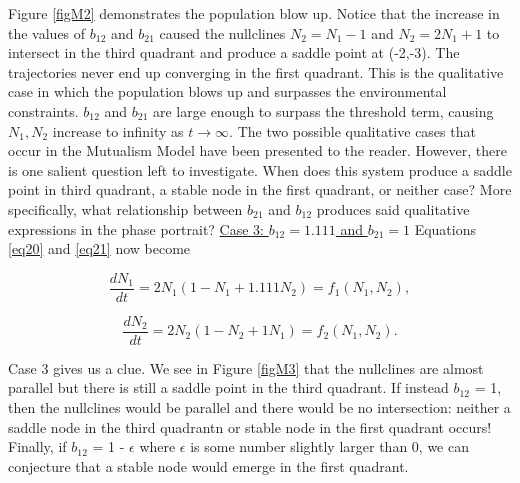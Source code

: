 \documentclass[11pt,a4paper]{scrartcl}
\theoremstyle{definition}
\begin{document}
Figure \ref{figM2} demonstrates the population blow up. Notice that the increase in the values of $b_{12}$ and $b_{21}$ caused the nullclines $N_2=N_1-1$ and $N_2=2N_1+1$ to intersect in the third quadrant and produce a saddle point at (-2,-3). The trajectories never end up converging in the first quadrant. This is the qualitative case in which the population blows up and surpasses the environmental constraints. $b_{12}$ and $b_{21}$ are large enough to surpass the threshold term, causing $N_1,N_2$ increase to infinity as $t \rightarrow \infty$.\newline\newline
The two possible qualitative cases that occur in the Mutualism Model have been presented to the reader. However, there is one salient question left to investigate. When does this system produce a saddle point in third quadrant, a stable node in the first quadrant, or neither case? More specifically, what relationship between $b_{21}$ and $b_{12}$ produces said qualitative expressions in the phase portrait?
\newline\newline
\underline{Case 3: $b_{12} = 1.111$ and $b_{21} = 1$}
\newline\newline
Equations \eqref{eq20} and \eqref{eq21} now become 

\begin{equation} \label{eq26}
	\frac{dN_1}{dt}=2N_1(1-N_1+1.111N_2)=f_1(N_1, N_2),
\end{equation}

\begin{equation} \label{eq27}
	\frac{dN_2}{dt}=2N_2(1-N_2+1N_1)=f_2(N_1, N_2).
\end{equation}

Case 3 gives us a clue. We see in Figure \ref{figM3} that the nullclines are almost parallel but there is still a saddle point in the third quadrant. If instead $b_{12}$ = 1, then the nullclines would be parallel and there would be no intersection: neither a saddle node in the third quadrantn or stable node in the first quadrant occurs! Finally, if $b_{12}$ = 1 - $\epsilon$ where $\epsilon$ is some number slightly larger than 0, we can conjecture that a stable node would emerge in the first quadrant. \newline
\end{document}
